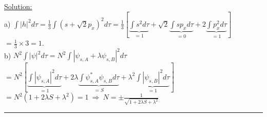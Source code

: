 \noindent
\underline{Solution:}\\

\noindent
a) $\int|h|^2d\tau = \frac{1}{3}\int\left( s + \sqrt{2}p_x\right)^2d\tau = 
\frac{1}{3}\left[\underbrace{\int s^2d\tau}_{= 1} + \sqrt{2}\underbrace
{\int sp_xd\tau}_{= 0} + 2\underbrace{\int p_x^2d\tau
}_{= 1}\right]$\\ $= \frac{1}{3}\times 3 = 1$.\\

\noindent
b)
$N^2\int|\psi|^2d\tau = N^2\int|\psi_{s,A} + \lambda\psi_{s,B}|^2d\tau$\\
$= N^2\left[ \underbrace{\int|\psi_{s,A}|^2d\tau}_{= 1}
+ 2\lambda\underbrace{\int\psi^*_{s,A}\psi_{s,B}d\tau}_{= S}
+ \lambda^2\underbrace{\int|\psi_{s,B}|^2d\tau}_{= 1}\right]$\\
$= N^2(1 + 2\lambda S + \lambda^2) = 1~\Rightarrow~N = \pm\frac{1}{\sqrt{1 + 2\lambda S + \lambda^2}}$\\
\hrule\vspace{0.5cm}



